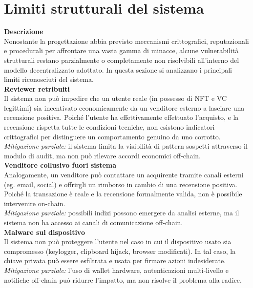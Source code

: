     \section{Limiti strutturali del sistema}
        \noindent \textbf{Descrizione} \\
            Nonostante la progettazione abbia previsto meccanismi crittografici, reputazionali e procedurali per affrontare una vasta gamma di minacce, alcune vulnerabilità strutturali restano parzialmente o completamente non risolvibili all'interno del modello decentralizzato adottato. In questa sezione si analizzano i principali limiti riconosciuti del sistema. \\

        \noindent \textbf{Reviewer retribuiti} \\
            Il sistema non può impedire che un utente reale (in possesso di NFT e VC legittimi) sia incentivato economicamente da un venditore esterno a lasciare una recensione positiva. Poiché l'utente ha effettivamente effettuato l'acquisto, e la recensione rispetta tutte le condizioni tecniche, non esistono indicatori crittografici per distinguere un comportamento genuino da uno corrotto. \\
            \textit{Mitigazione parziale:} il sistema limita la visibilità di pattern sospetti attraverso il modulo di audit, ma non può rilevare accordi economici off-chain. \\

        \noindent \textbf{Venditore collusivo fuori sistema} \\
            Analogamente, un venditore può contattare un acquirente tramite canali esterni (eg. email, social) e offrirgli un rimborso in cambio di una recensione positiva. Poiché la transazione è reale e la recensione formalmente valida, non è possibile intervenire on-chain. \\
            \textit{Mitigazione parziale:} possibili indizi possono emergere da analisi esterne, ma il sistema non ha accesso ai canali di comunicazione off-chain. \\

        \noindent \textbf{Malware sul dispositivo} \\
            Il sistema non può proteggere l'utente nel caso in cui il dispositivo usato sia compromesso (keylogger, clipboard hijack, browser modificati). In tal caso, la chiave privata può essere esfiltrata e usata per firmare azioni indesiderate. \\
            \textit{Mitigazione parziale:} l'uso di wallet hardware, autenticazioni multi-livello e notifiche off-chain può ridurre l'impatto, ma non risolve il problema alla radice. \\

